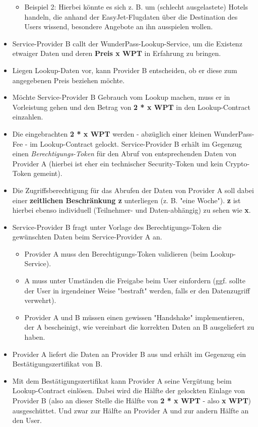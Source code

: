 \begin{Solution}
\begin{itemize}
\begin{itemize}
  	\item Beispiel 2: Hierbei könnte es sich z. B. um (schlecht ausgelastete) Hotels handeln, die anhand der EasyJet-Flugdaten über die Destination des Users wissend, besondere Angebote an ihn ausspielen wollen.
  \end{itemize}
  \item Service-Provider B callt der WunderPass-Lookup-Service, um die Existenz etwaiger Daten und deren \textbf{Preis x WPT} in Erfahrung zu bringen.
  \item Liegen Lookup-Daten vor, kann Provider B entscheiden, ob er diese zum angegebenen Preis beziehen möchte. 
  \item Möchte Service-Provider B Gebrauch vom Lookup machen, muss er in Vorleistung gehen und den Betrag von \textbf{2 * x WPT} in den Lookup-Contract einzahlen.
  \item Die eingebrachten \textbf{2 * x WPT} werden - abzüglich einer kleinen WunderPass-Fee - im Lookup-Contract gelockt. Service-Provider B erhält im Gegenzug einen \textit{Berechtigungs-Token} für den Abruf von entsprechenden Daten von Provider A (hierbei ist eher ein technischer Security-Token und kein Crypto-Token gemeint).
  \item Die Zugriffsberechtigung für das Abrufen der Daten von Provider A soll dabei einer \textbf{zeitlichen Beschränkung z} unterliegen (z. B. "eine Woche"). \textbf{z} ist hierbei ebenso individuell (Teilnehmer- und Daten-abhängig) zu sehen wie \textbf{x}.
  \item Service-Provider B fragt unter Vorlage des Berechtigungs-Token die gewünschten Daten beim Service-Provider A an.
  \begin{itemize}
  	\item Provider A muss den Berechtigungs-Token validieren (beim Lookup-Service).
  	\item A muss unter Umständen die Freigabe beim User einfordern (ggf. sollte der User in irgendeiner Weise "bestraft" werden, falls er den Datenzugriff verwehrt).
  	\item Provider A und B müssen einen gewissen "Handshake" implementieren, der A bescheinigt, wie vereinbart die korrekten Daten an B ausgeliefert zu haben. 
  \end{itemize}
  \item Provider A liefert die Daten an Provider B aus und erhält im Gegenzug ein Bestätigungszertifikat von B.
  \item Mit dem Bestätigungszertifikat kann Provider A seine Vergütung beim Lookup-Contract einlösen. Dabei wird die Hälfte der gelockten Einlage von Provider B (also an dieser Stelle die Hälfte von \textbf{2 * x WPT} - also \textbf{x WPT}) ausgeschüttet. Und zwar zur Hälfte an Provider A und zur andern Hälfte an den User.

\end{itemize}
\end{Solution}
